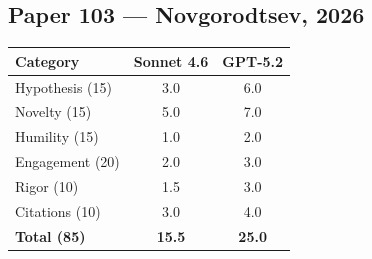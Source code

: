 \documentclass[11pt]{article}
\begin{document}
\subsection*{Paper 103 --- Novgorodtsev, 2026}

\medskip

\begin{tabular}{lcc}
\toprule
\textbf{Category} & \textbf{Sonnet 4.6} & \textbf{GPT-5.2} \\
\midrule
Hypothesis (15) & 3.0 & 6.0 \\
Novelty (15) & 5.0 & 7.0 \\
Humility (15) & 1.0 & 2.0 \\
Engagement (20) & 2.0 & 3.0 \\
Rigor (10) & 1.5 & 3.0 \\
Citations (10) & 3.0 & 4.0 \\
\midrule
\textbf{Total (85)} & \textbf{15.5} & \textbf{25.0} \\
\bottomrule
\end{tabular}

\bigskip
\end{document}

